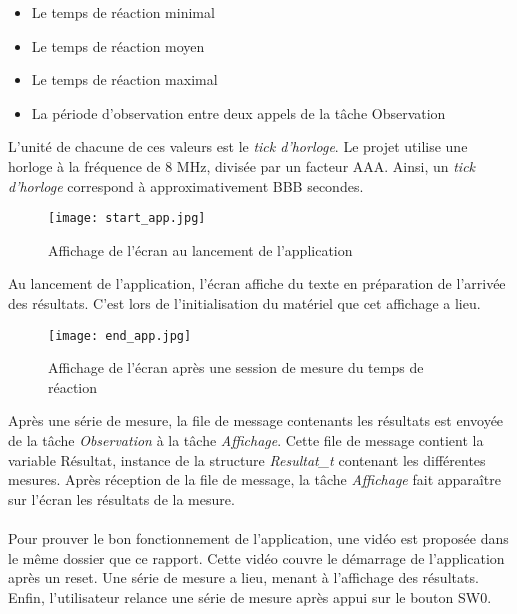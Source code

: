 \begin{itemize}
    \item Le temps de réaction minimal
    \item Le temps de réaction moyen
    \item Le temps de réaction maximal
    \item La période d'observation entre deux appels de la tâche Observation
\end{itemize}

L'unité de chacune de ces valeurs est le \textit{tick d'horloge}.
Le projet utilise une horloge à la fréquence de 8 MHz, divisée par un facteur AAA.
Ainsi, un \textit{tick d'horloge} correspond à approximativement BBB secondes.

\begin{figure}[h]
    \centering
    \texttt{[image: start\_app.jpg]}
    \caption{Affichage de l'écran au lancement de l'application}
    \label{fig:start_app}
\end{figure}

Au lancement de l'application, l'écran affiche du texte en préparation de l'arrivée des résultats.
C'est lors de l'initialisation du matériel que cet affichage a lieu.

\begin{figure}[h]
    \centering
    \texttt{[image: end\_app.jpg]}
    \caption{Affichage de l'écran après une session de mesure du temps de réaction}
    \label{fig:end_app}
\end{figure}

Après une série de mesure, la file de message contenants les résultats est envoyée de la tâche \textit{Observation} à la tâche \textit{Affichage}.
Cette file de message contient la variable Résultat, instance de la structure \textit{Resultat\_t} contenant les différentes mesures.
Après réception de la file de message, la tâche \textit{Affichage} fait apparaître sur l'écran les résultats de la mesure.
\\\\
Pour prouver le bon fonctionnement de l'application, une vidéo est proposée dans le même dossier que ce rapport.
Cette vidéo couvre le démarrage de l'application après un reset. 
Une série de mesure a lieu, menant à l'affichage des résultats.
Enfin, l'utilisateur relance une série de mesure après appui sur le bouton SW0.